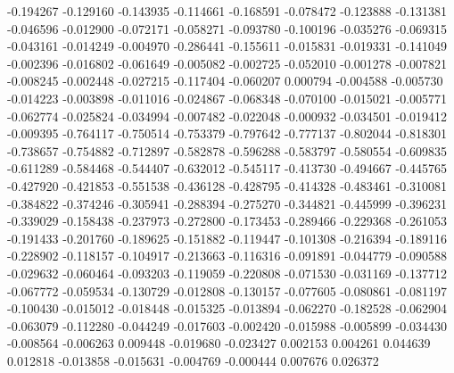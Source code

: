 -0.194267
-0.129160
-0.143935
-0.114661
-0.168591
-0.078472
-0.123888
-0.131381
-0.046596
-0.012900
-0.072171
-0.058271
-0.093780
-0.100196
-0.035276
-0.069315
-0.043161
-0.014249
-0.004970
-0.286441
-0.155611
-0.015831
-0.019331
-0.141049
-0.002396
-0.016802
-0.061649
-0.005082
-0.002725
-0.052010
-0.001278
-0.007821
-0.008245
-0.002448
-0.027215
-0.117404
-0.060207
0.000794
-0.004588
-0.005730
-0.014223
-0.003898
-0.011016
-0.024867
-0.068348
-0.070100
-0.015021
-0.005771
-0.062774
-0.025824
-0.034994
-0.007482
-0.022048
-0.000932
-0.034501
-0.019412
-0.009395
-0.764117
-0.750514
-0.753379
-0.797642
-0.777137
-0.802044
-0.818301
-0.738657
-0.754882
-0.712897
-0.582878
-0.596288
-0.583797
-0.580554
-0.609835
-0.611289
-0.584468
-0.544407
-0.632012
-0.545117
-0.413730
-0.494667
-0.445765
-0.427920
-0.421853
-0.551538
-0.436128
-0.428795
-0.414328
-0.483461
-0.310081
-0.384822
-0.374246
-0.305941
-0.288394
-0.275270
-0.344821
-0.445999
-0.396231
-0.339029
-0.158438
-0.237973
-0.272800
-0.173453
-0.289466
-0.229368
-0.261053
-0.191433
-0.201760
-0.189625
-0.151882
-0.119447
-0.101308
-0.216394
-0.189116
-0.228902
-0.118157
-0.104917
-0.213663
-0.116316
-0.091891
-0.044779
-0.090588
-0.029632
-0.060464
-0.093203
-0.119059
-0.220808
-0.071530
-0.031169
-0.137712
-0.067772
-0.059534
-0.130729
-0.012808
-0.130157
-0.077605
-0.080861
-0.081197
-0.100430
-0.015012
-0.018448
-0.015325
-0.013894
-0.062270
-0.182528
-0.062904
-0.063079
-0.112280
-0.044249
-0.017603
-0.002420
-0.015988
-0.005899
-0.034430
-0.008564
-0.006263
0.009448
-0.019680
-0.023427
0.002153
0.004261
0.044639
0.012818
-0.013858
-0.015631
-0.004769
-0.000444
0.007676
0.026372
